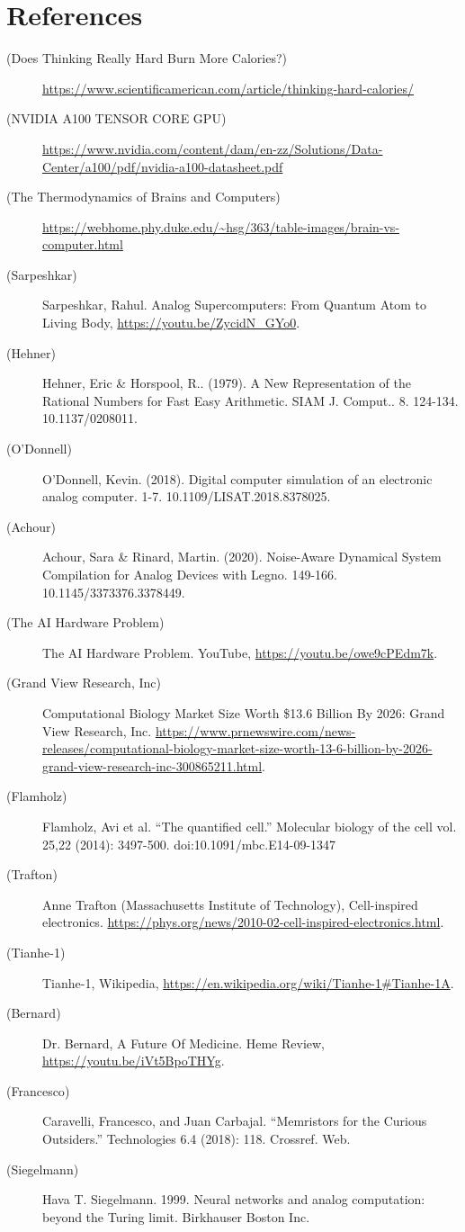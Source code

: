 \newpage
\section*{References}

\newcommand{\sourceEntry}[2]{
\item [({#1})]{#2}
}

\begin{description}
\sourceEntry{Does Thinking Really Hard Burn More Calories?}{\url{https://www.scientificamerican.com/article/thinking-hard-calories/}}
\sourceEntry{NVIDIA A100
TENSOR CORE GPU}{\url{https://www.nvidia.com/content/dam/en-zz/Solutions/Data-Center/a100/pdf/nvidia-a100-datasheet.pdf}}
\sourceEntry{The Thermodynamics of Brains and Computers}{\url{https://webhome.phy.duke.edu/~hsg/363/table-images/brain-vs-computer.html}}
\sourceEntry{Sarpeshkar}{Sarpeshkar, Rahul. Analog Supercomputers: From Quantum Atom to Living Body, \url{https://youtu.be/ZycidN_GYo0}.}
\sourceEntry{Hehner}{Hehner, Eric \& Horspool, R.. (1979). A New Representation of the Rational Numbers for Fast Easy Arithmetic. SIAM J. Comput.. 8. 124-134. 10.1137/0208011.}
\sourceEntry{O'Donnell}{O'Donnell, Kevin. (2018). Digital computer simulation of an electronic analog computer. 1-7. 10.1109/LISAT.2018.8378025. }
\sourceEntry{Achour}{Achour, Sara \& Rinard, Martin. (2020). Noise-Aware Dynamical System Compilation for Analog Devices with Legno. 149-166. 10.1145/3373376.3378449.}
\sourceEntry{The AI Hardware Problem}{The AI Hardware Problem. YouTube, \url{https://youtu.be/owe9cPEdm7k}.}
\sourceEntry{Grand View Research, Inc}{Computational Biology Market Size Worth \$13.6 Billion By 2026: Grand View Research, Inc. \url{https://www.prnewswire.com/news-releases/computational-biology-market-size-worth-13-6-billion-by-2026-grand-view-research-inc-300865211.html}.}
\sourceEntry{Flamholz}{Flamholz, Avi et al. “The quantified cell.” Molecular biology of the cell vol. 25,22 (2014): 3497-500. doi:10.1091/mbc.E14-09-1347}
\sourceEntry{Trafton}{Anne Trafton (Massachusetts Institute of Technology), Cell-inspired electronics. \url{https://phys.org/news/2010-02-cell-inspired-electronics.html}.}
\sourceEntry{Tianhe-1}{Tianhe-1, Wikipedia, \url{https://en.wikipedia.org/wiki/Tianhe-1\#Tianhe-1A}.}
\sourceEntry{Bernard}{Dr. Bernard, A Future Of Medicine. Heme Review, \url{https://youtu.be/iVt5BpoTHYg}.}
\sourceEntry{Francesco}{Caravelli, Francesco, and Juan Carbajal. “Memristors for the Curious Outsiders.” Technologies 6.4 (2018): 118. Crossref. Web.}
\sourceEntry{Siegelmann}{Hava T. Siegelmann. 1999. Neural networks and analog computation: beyond the Turing limit. Birkhauser Boston Inc.}

\end{description}
